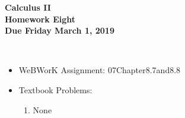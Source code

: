 \documentclass[12pt]{article}
\begin{document}
\pagestyle{empty}
 
\begin{center}
{\large {\bf Calculus II}}\\
\medskip
{\large {\bf Homework Eight}}\\
\medskip
{ {\bf Due Friday March 1, 2019}}\\
\end{center}

 \\ 



\begin{itemize}
\setlength{\itemsep}{0mm}
\item WeBWorK Assignment: 07Chapter8.7and8.8
\item Textbook Problems:
  \begin{enumerate}
  \setlength{\itemsep}{-1mm}
    \item None
  \end{enumerate}
\end{itemize}

\end{document}
